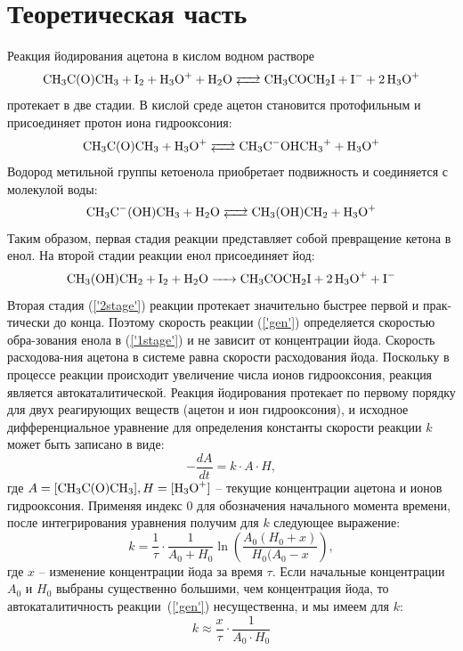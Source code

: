 \documentclass[a4paper, 12pt]{article}
\begin{document}
\section{Теоретическая часть}
Реакция йодирования ацетона в кислом водном растворе
\begin{equation}\label{'gen'}
\ce{CH3C(O)CH3 + I2 + H3O^+ + H2O <--> CH3COCH2I + I^- + 2H3O^+}
\end{equation}
протекает в две стадии. В кислой среде ацетон становится протофильным и присоединяет протон иона гидрооксония:
\begin{equation}\label{'1stage'}
\ce{CH3C(O)CH3 + H3O^+ <--> CH3C^{-}OHCH3^+ + H3O^+}
\end{equation}
Водород метильной группы кетоенола приобретает подвижность и соединяется с молекулой воды:
\begin{equation*}
\ce{CH3C^{-}(OH)CH3 + H2O <--> CH3(OH)CH2 + H3O^+}
\end{equation*}
Таким образом, первая стадия реакции представляет собой превращение кетона в енол. На второй стадии реакции енол присоединяет йод:
\begin{equation}\label{'2stage'}
\ce{CH3(OH)CH2 + I2 + H2O -> CH3COCH2I + 2H3O^+ + I-}
\end{equation}
Вторая стадия (\ref{'2stage'}) реакции протекает значительно быстрее первой и прак-тически до конца. Поэтому скорость реакции (\ref{'gen'}) определяется скоростью обра-зования енола в (\ref{'1stage'}) и не зависит от концентрации йода. Скорость расходова-ния ацетона в системе равна скорости расходования йода. Поскольку в процессе реакции происходит увеличение числа ионов гидрооксония, реакция является автокаталитической. Реакция йодирования протекает по первому порядку для двух реагирующих веществ (ацетон и ион гидрооксония), и исходное дифференциальное уравнение для определения константы скорости реакции $k$ может быть записано в виде:
\[-\frac{dA}{dt}=k\cdot A\cdot H,\]
где $A = [\ce{CH3C(O)CH3}], H = [\ce{H3O+}]$ – текущие концентрации ацетона и ионов гидрооксония. Применяя индекс $0$ для обозначения начального момента времени, после интегрирования уравнения получим для $k$ следующее выражение:
\[k=\frac{1}{\tau}\cdot\frac{1}{A_0+H_0}\ln{\left(\frac{A_0(H_0+x)}{H_0(A_0-x}\right)},\]
где $x$ – изменение концентрации йода за время $\tau$. Если начальные концентрации $A_0$ и $H_0$ выбраны существенно большими, чем концентрация йода, то автокаталитичность реакции~(\ref{'gen'}) несущественна, и мы имеем для $k$: 
\begin{equation}
k\approx \frac{x}{\tau}\cdot\frac{1}{A_0\cdot H_0}
\end{equation}
\end{document}
